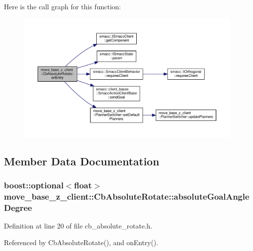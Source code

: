 Here is the call graph for this function\+:\nopagebreak
\begin{figure}[H]
\begin{center}
\leavevmode
\includegraphics[width=350pt]{classmove__base__z__client_1_1CbAbsoluteRotate_ab5537a52d9ddb242be60e6f9e0b231af_cgraph}
\end{center}
\end{figure}




\subsection{Member Data Documentation}
\subsubsection[{\texorpdfstring{absolute\+Goal\+Angle\+Degree}{absoluteGoalAngleDegree}}]{\setlength{\rightskip}{0pt plus 5cm}boost\+::optional$<$float$>$ move\+\_\+base\+\_\+z\+\_\+client\+::\+Cb\+Absolute\+Rotate\+::absolute\+Goal\+Angle\+Degree}\hypertarget{classmove__base__z__client_1_1CbAbsoluteRotate_a3732ce20b520f9df9408f849ff809a19}{}\label{classmove__base__z__client_1_1CbAbsoluteRotate_a3732ce20b520f9df9408f849ff809a19}


Definition at line 20 of file cb\+\_\+absolute\+\_\+rotate.\+h.



Referenced by Cb\+Absolute\+Rotate(), and on\+Entry().

